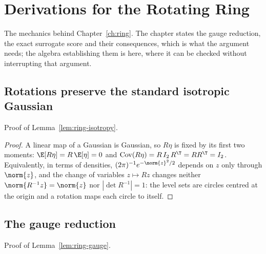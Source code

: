 \chapter{Derivations for the Rotating Ring}
\label{app:ring}

The mechanics behind Chapter~\ref{ch:ring}. The chapter states the gauge
reduction, the exact surrogate score and their consequences, which is what the
argument needs; the algebra establishing them is here, where it can be checked
without interrupting that argument.

\section{Rotations preserve the standard isotropic Gaussian}

Proof of Lemma~\ref{lem:ring-isotropy}.

\begin{proof}
A linear map of a Gaussian is Gaussian, so $R\eta$ is fixed by its first two
moments: $\E[R\eta] = R\,\E[\eta] = 0$ and
$\mathrm{Cov}(R\eta) = R\, I_2\, R^{\T} = R R^{\T} = I_2$. Equivalently, in
terms of densities, $(2\pi)^{-1}e^{-\norm{z}^2/2}$ depends on $z$ only through
$\norm{z}$, and the change of variables $z \mapsto Rz$ changes neither
$\norm{R^{-1}z} = \norm{z}$ nor $|\det R^{-1}| = 1$: the level sets are circles
centred at the origin and a rotation maps each circle to itself.
\end{proof}

\section{The gauge reduction}

Proof of Lemma~\ref{lem:ring-gauge}.


